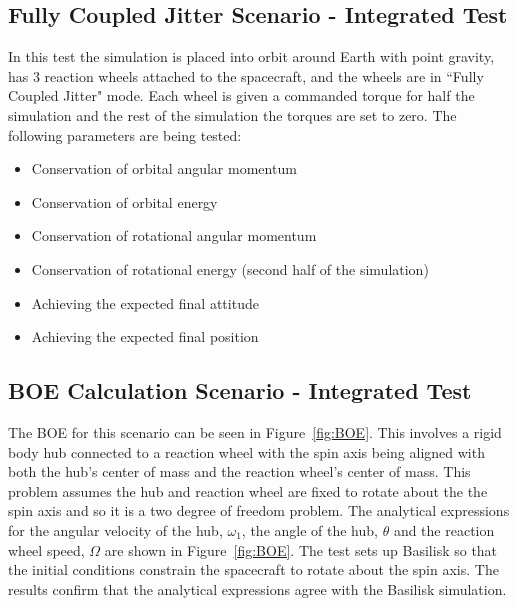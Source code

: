 \subsection{Fully Coupled Jitter Scenario - Integrated Test}
In this test the simulation is placed into orbit around Earth with point gravity, has 3 reaction wheels attached to the spacecraft, and the wheels are in ``Fully Coupled Jitter" mode. Each wheel is given a commanded torque for half the simulation and the rest of the simulation the torques are set to zero. The following parameters are being tested:
\begin{itemize}
\item Conservation of orbital angular momentum
\item Conservation of orbital energy
\item Conservation of rotational angular momentum
\item Conservation of rotational energy (second half of the simulation)
\item Achieving the expected final attitude
\item Achieving the expected final position
\end{itemize}

\subsection{BOE Calculation Scenario - Integrated Test}

The BOE for this scenario can be seen in Figure~\ref{fig:BOE}. This involves a rigid body hub connected to a reaction wheel with the spin axis being aligned with both the hub's center of mass and the reaction wheel's center of mass. This problem assumes the hub and reaction wheel are fixed to rotate about the the spin axis and so it is a two degree of freedom problem. The analytical expressions for the angular velocity of the hub, $\omega_1$, the angle of the hub, $\theta$ and the reaction wheel speed, $\Omega$ are shown in Figure~\ref{fig:BOE}. The test sets up Basilisk so that the initial conditions constrain the spacecraft to rotate about the spin axis. The results confirm that the analytical expressions agree with the Basilisk simulation. 

